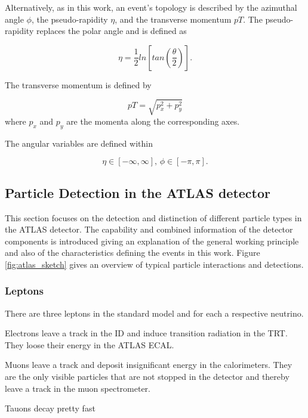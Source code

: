Alternatively, as in this work, an event's topology is described by the azimuthal angle $\phi$, the pseudo-rapidity $\eta$, and the transverse momentum $pT$. The pseudo-rapidity replaces the polar angle and is defined as

\begin{equation}
\eta = \frac{1}{2} ln\left[ tan\left(\frac{\theta}{2}\right)\right].
\end{equation}

The transverse momentum is defined by

\begin{equation}
pT = \sqrt{p_x^2 + p_y^2}
\end{equation}
where $p_x$ and $p_y$ are the momenta along the corresponding axes. 

The angular variables are defined within

\begin{equation}
\eta \in [-\infty,\infty],\,
\phi \in [-\pi,\pi].
\end{equation}

\subsection{Particle Detection in the ATLAS detector}

This section focuses on the detection and distinction of different particle types in the ATLAS detector. The capability and combined information of the detector components is introduced giving an explanation of the general working principle and also of the characteristics defining the events in this work. Figure \ref{fig:atlas_sketch} gives an overview of typical particle interactions and detections.

\subsubsection{Leptons}

There are three leptons in the standard model and for each a respective neutrino.

Electrons leave a track in the ID and induce transition radiation in the TRT. They loose their energy in the ATLAS ECAL.

Muons leave a track and deposit insignificant energy in the calorimeters. They are the only visible particles that are not stopped in the detector and thereby leave a track in the muon spectrometer.

Tauons decay pretty fast

